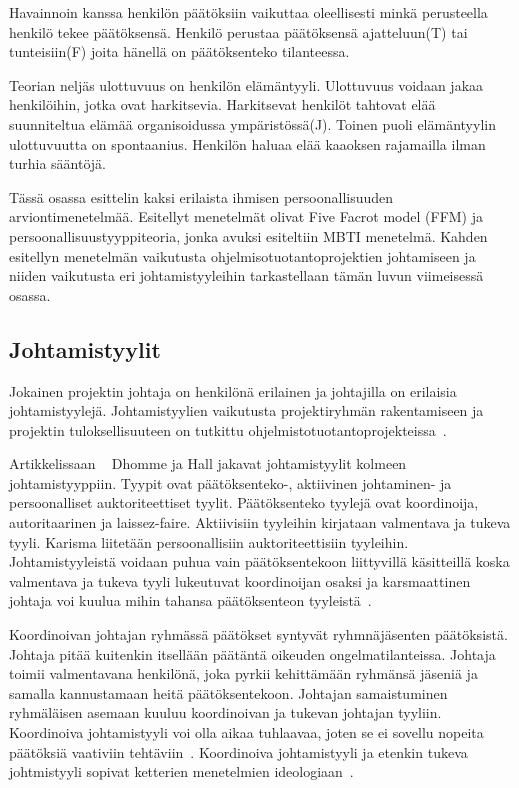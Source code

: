 \documentclass[finnish]{tktltiki2}
\theoremstyle{definition}
\theoremstyle{remark}
\begin{document}
Havainnoin kanssa henkilön päätöksiin vaikuttaa oleellisesti minkä perusteella henkilö tekee päätöksensä. Henkilö perustaa päätöksensä ajatteluun(T) tai tunteisiin(F) joita hänellä on päätöksenteko tilanteessa.

Teorian neljäs ulottuvuus on henkilön elämäntyyli. Ulottuvuus voidaan jakaa henkilöihin, jotka ovat harkitsevia. Harkitsevat henkilöt tahtovat elää suunniteltua elämää organisoidussa ympäristössä(J). Toinen puoli elämäntyylin ulottuvuutta on spontaanius. Henkilön haluaa elää kaaoksen rajamailla ilman turhia sääntöjä.

Tässä osassa esittelin kaksi erilaista ihmisen persoonallisuuden arviontimenetelmää. Esitellyt menetelmät olivat Five Facrot model (FFM) ja persoonallisuustyyppiteoria, jonka avuksi esiteltiin MBTI menetelmä. Kahden esitellyn menetelmän vaikutusta ohjelmisotuotantoprojektien johtamiseen ja niiden vaikutusta eri johtamistyyleihin tarkastellaan tämän luvun viimeisessä osassa.   

\subsection{Johtamistyylit}

Jokainen projektin johtaja on henkilönä erilainen ja johtajilla on erilaisia johtamistyylejä. Johtamistyylien vaikutusta projektiryhmän rakentamiseen ja projektin tuloksellisuuteen on tutkittu ohjelmistotuotantoprojekteissa~\cite{Dhomne:2012:ITL:2382887.2382899}. 

Artikkelissaan ~\cite{Dhomne:2012:ITL:2382887.2382899} Dhomme ja Hall jakavat johtamistyylit kolmeen johtamistyyppiin. Tyypit ovat päätöksenteko-, aktiivinen johtaminen- ja persoonalliset auktoriteettiset tyylit. Päätöksenteko tyylejä ovat koordinoija, autoritaarinen ja laissez-faire. Aktiivisiin tyyleihin kirjataan valmentava ja tukeva tyyli. Karisma liitetään persoonallisiin auktoriteettisiin tyyleihin. Johtamistyyleistä voidaan puhua vain päätöksentekoon liittyvillä käsitteillä koska valmentava ja tukeva tyyli lukeutuvat koordinoijan osaksi ja karsmaattinen johtaja voi kuulua mihin tahansa päätöksenteon tyyleistä~\cite{Dhomne:2012:ITL:2382887.2382899}. 

Koordinoivan johtajan ryhmässä päätökset syntyvät ryhmnäjäsenten päätöksistä. Johtaja pitää kuitenkin itsellään päätäntä oikeuden ongelmatilanteissa. Johtaja toimii valmentavana henkilönä, joka pyrkii kehittämään ryhmänsä jäseniä ja samalla kannustamaan heitä päätöksentekoon. Johtajan samaistuminen ryhmäläisen asemaan kuuluu koordinoivan ja tukevan johtajan tyyliin. Koordinoiva johtamistyyli voi olla aikaa tuhlaavaa, joten se ei sovellu nopeita päätöksiä vaativiin tehtäviin~\cite{Dhomne:2012:ITL:2382887.2382899}. Koordinoiva johtamistyyli ja etenkin tukeva johtmistyyli sopivat ketterien menetelmien ideologiaan~\cite{fowler2001agile}.
\end{document}
